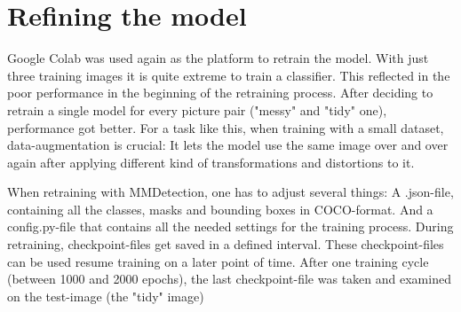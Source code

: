 \section{Refining the model}
\label{refining-the-model}

Google Colab was used again as the platform to retrain the model. With just three training images it is quite extreme to train a classifier. This reflected in the poor performance in the beginning of the retraining process. After deciding to retrain a single model for every picture pair ("messy" and "tidy" one), performance got better. For a task like this, when training with a small dataset, data-augmentation is crucial: It lets the model use the same image over and over again after applying different kind of transformations and distortions to it.

When retraining with MMDetection, one has to adjust several things: A .json-file, containing all the classes, masks and bounding boxes in COCO-format. And a config.py-file that contains all the needed settings for the training process. During retraining, checkpoint-files get saved in a defined interval. These checkpoint-files can be used resume training on a later point of time. After one training cycle (between 1000 and 2000 epochs), the last checkpoint-file was taken and examined on the test-image (the "tidy" image)